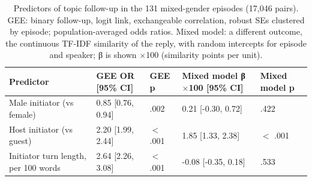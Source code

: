 \begin{table}[htbp]
\centering
\small
\caption{Predictors of topic follow-up in the 131 mixed-gender episodes (17,046 pairs). GEE: binary follow-up, logit link, exchangeable correlation, robust SEs clustered by episode; population-averaged odds ratios. Mixed model: a different outcome, the continuous TF-IDF similarity of the reply, with random intercepts for episode and speaker; β is shown $\times$100 (similarity points per unit).}
\label{tab:table12_corrected}
\begin{tabular}{lllll}
\toprule
Predictor & GEE OR [95\% CI] & GEE p & Mixed model β $\times$100 [95\% CI] & Mixed model p \\
\midrule
Male initiator (vs female) & 0.85 [0.76, 0.94] & .002 & 0.21 [-0.30, 0.72] & .422 \\
Host initiator (vs guest) & 2.20 [1.99, 2.44] & $<$ .001 & 1.85 [1.33, 2.38] & $<$ .001 \\
Initiator turn length, per 100 words & 2.64 [2.26, 3.08] & $<$ .001 & -0.08 [-0.35, 0.18] & .533 \\
\bottomrule
\end{tabular}
\end{table}

